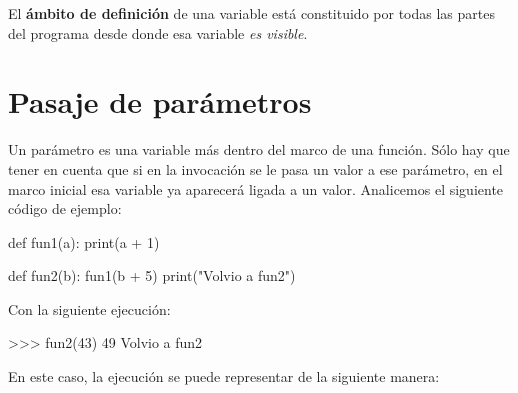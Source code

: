 El {\bf ámbito de definición} de una variable está constituido por todas las
partes del programa desde donde esa variable \emph{es visible}.

\section{Pasaje de parámetros}

Un parámetro es una variable más dentro del marco de una función.
Sólo hay que tener en cuenta que si en la invocación se le pasa
un valor a ese parámetro, en el marco inicial esa variable ya aparecerá
ligada a un valor. Analicemos el siguiente código de ejemplo:

\begin{codigo-python-sn}
def fun1(a):
    print(a + 1)

def fun2(b):
    fun1(b + 5)
    print("Volvio a fun2")
\end{codigo-python-sn}

Con la siguiente ejecución:

\begin{codigo-python-sn}
>>> fun2(43)
49
Volvio a fun2
\end{codigo-python-sn}

En este caso, la ejecución se puede representar de la siguiente manera:

